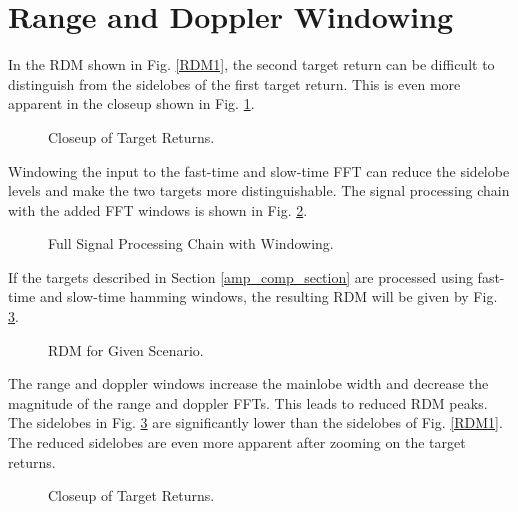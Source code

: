 \documentclass[conference]{IEEEtran}
\begin{document}
\section{Range and Doppler Windowing}
In the RDM shown in Fig. \ref{RDM1}, the second target return can be difficult to distinguish from the sidelobes of the first target return. This is even more apparent in the closeup shown in Fig. \ref{RDM1_close}.
\begin{figure}[H]
\centerline{}
\caption{Closeup of Target Returns.}
\label{RDM1_close}
\end{figure}
\noindent
Windowing the input to the fast-time and slow-time FFT can reduce the sidelobe levels and make the two targets more distinguishable. The signal processing chain with the added FFT windows is shown in Fig. \ref{Full_Chain}.
\begin{figure}[H]
\centerline{}
\caption{Full Signal Processing Chain with Windowing.}
\label{Full_Chain}
\end{figure}
\noindent
If the targets described in Section \ref{amp_comp_section} are processed using fast-time and slow-time hamming windows,
the resulting RDM will be given by Fig. \ref{RDM2}.
\begin{figure}[H]
\centerline{}
\caption{RDM for Given Scenario.}
\label{RDM2}
\end{figure}
\noindent
The range and doppler windows increase the mainlobe width and decrease the magnitude of the range and doppler FFTs. This leads to reduced RDM peaks. The sidelobes in Fig. \ref{RDM2} are significantly lower than the sidelobes of Fig. \ref{RDM1}. The reduced sidelobes are even more apparent after zooming on the target returns.
\begin{figure}[H]
\centerline{}
\caption{Closeup of Target Returns.}
\label{RDM2_close}
\end{figure}
\end{document}
